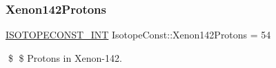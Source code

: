 \subsubsection{\texorpdfstring{Xenon142\+Protons}{Xenon142Protons}}
{\footnotesize\ttfamily \mbox{\hyperlink{group___isotope_const-_macros_ga5f18360b3e99483a35c32d789e62621c}{I\+S\+O\+T\+O\+P\+E\+C\+O\+N\+S\+T\+\_\+\+I\+NT}} Isotope\+Const\+::\+Xenon142\+Protons = 54}

\$ \$ Protons in Xenon-\/142. 